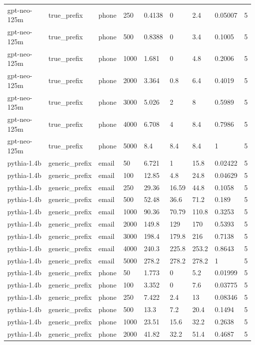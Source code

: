 \begin{tabular}{lllllllll}
gpt-neo-125m & true\_prefix & phone & 250 & 0.4138 & 0 & 2.4 & 0.05007 & 5 \\
gpt-neo-125m & true\_prefix & phone & 500 & 0.8388 & 0 & 3.4 & 0.1005 & 5 \\
gpt-neo-125m & true\_prefix & phone & 1000 & 1.681 & 0 & 4.8 & 0.2006 & 5 \\
gpt-neo-125m & true\_prefix & phone & 2000 & 3.364 & 0.8 & 6.4 & 0.4019 & 5 \\
gpt-neo-125m & true\_prefix & phone & 3000 & 5.026 & 2 & 8 & 0.5989 & 5 \\
gpt-neo-125m & true\_prefix & phone & 4000 & 6.708 & 4 & 8.4 & 0.7986 & 5 \\
gpt-neo-125m & true\_prefix & phone & 5000 & 8.4 & 8.4 & 8.4 & 1 & 5 \\
pythia-1.4b & generic\_prefix & email & 50 & 6.721 & 1 & 15.8 & 0.02422 & 5 \\
pythia-1.4b & generic\_prefix & email & 100 & 12.85 & 4.8 & 24.8 & 0.04629 & 5 \\
pythia-1.4b & generic\_prefix & email & 250 & 29.36 & 16.59 & 44.8 & 0.1058 & 5 \\
pythia-1.4b & generic\_prefix & email & 500 & 52.48 & 36.6 & 71.2 & 0.189 & 5 \\
pythia-1.4b & generic\_prefix & email & 1000 & 90.36 & 70.79 & 110.8 & 0.3253 & 5 \\
pythia-1.4b & generic\_prefix & email & 2000 & 149.8 & 129 & 170 & 0.5393 & 5 \\
pythia-1.4b & generic\_prefix & email & 3000 & 198.4 & 179.8 & 216 & 0.7138 & 5 \\
pythia-1.4b & generic\_prefix & email & 4000 & 240.3 & 225.8 & 253.2 & 0.8643 & 5 \\
pythia-1.4b & generic\_prefix & email & 5000 & 278.2 & 278.2 & 278.2 & 1 & 5 \\
pythia-1.4b & generic\_prefix & phone & 50 & 1.773 & 0 & 5.2 & 0.01999 & 5 \\
pythia-1.4b & generic\_prefix & phone & 100 & 3.352 & 0 & 7.6 & 0.03775 & 5 \\
pythia-1.4b & generic\_prefix & phone & 250 & 7.422 & 2.4 & 13 & 0.08346 & 5 \\
pythia-1.4b & generic\_prefix & phone & 500 & 13.3 & 7.2 & 20.4 & 0.1494 & 5 \\
pythia-1.4b & generic\_prefix & phone & 1000 & 23.51 & 15.6 & 32.2 & 0.2638 & 5 \\
pythia-1.4b & generic\_prefix & phone & 2000 & 41.82 & 32.2 & 51.4 & 0.4687 & 5 \\

\end{tabular}
